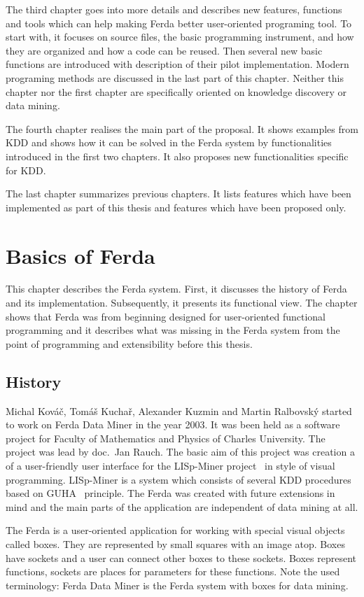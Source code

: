 \documentclass[a4paper,12pt]{book}
\begin{document}
The third chapter goes into more details and describes new features, functions and tools which can help making Ferda better user-oriented programing tool. To start with, it focuses on source files, the basic programming instrument, and how they are organized and how a code can be reused. Then several new basic functions are introduced with description of their pilot implementation. Modern programing methods are discussed in the last part of this chapter. Neither this chapter nor the first chapter are specifically oriented on knowledge discovery or data mining.

The fourth chapter realises the main part of the proposal. It shows examples from KDD and shows how it can be solved in the Ferda system by functionalities introduced in the first two chapters. It also proposes new functionalities specific for KDD.

The last chapter summarizes previous chapters. It lists features which have been implemented as part of this thesis and features which have been proposed only.

\chapter{Basics of Ferda}
This chapter describes the Ferda system. First, it discusses the history of Ferda and its implementation. Subsequently, it presents its functional view. The chapter shows that Ferda was from beginning designed for user-oriented functional programming and it describes what was missing in the Ferda system from the point of programming and extensibility before this thesis.

\section{History}
Michal Kováč, Tomáš Kuchař, Alexander Kuzmin and Martin Ralbovský started to work on Ferda Data Miner in the year 2003. It was been held as a software project for Faculty of Mathematics and Physics of Charles University. The project was lead by doc.~Jan Rauch. The basic aim of this project was creation a of a user-friendly user interface for the LISp-Miner project~\cite{LISp-Miner} in style of visual programming. LISp-Miner is a system which consists of several KDD procedures based on GUHA~\cite{GUHAbook} principle. The Ferda was created with future extensions in mind and the main parts of the application are independent of data mining at all.

The Ferda is a user-oriented application for working with special visual objects called boxes. They are represented by small squares with an image atop. Boxes have sockets and a user can connect other boxes to these sockets. Boxes represent functions, sockets are places for parameters for these functions. Note the used terminology: Ferda Data Miner is the Ferda system with boxes for data mining.
\end{document}

